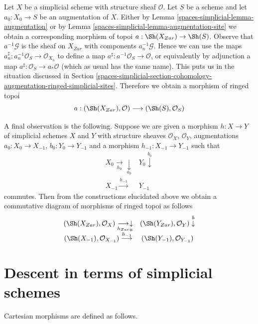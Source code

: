 \medskip\noindent
Let $X$ be a simplicial scheme with structure sheaf $\mathcal{O}$.
Let $S$ be a scheme and let $a_0 : X_0 \to S$ be an augmentation of $X$.
Either by
Lemma \ref{spaces-simplicial-lemma-augmentation} or by
Lemma \ref{spaces-simplicial-lemma-augmentation-site}
we obtain a corresponding morphism of topoi $a : \Sh(X_{Zar}) \to \Sh(S)$.
Observe that $a^{-1}\mathcal{G}$ is the sheaf on $X_{Zar}$ with components
$a_n^{-1}\mathcal{G}$. Hence we can use the maps
$a_n^\sharp : a_n^{-1}\mathcal{O}_S \to \mathcal{O}_{X_n}$ to define
a map $a^\sharp : a^{-1}\mathcal{O}_S \to \mathcal{O}$, or equivalently
by adjunction a map $a^\sharp : \mathcal{O}_S \to a_*\mathcal{O}$
(which as usual has the same name). This puts us in the situation
discussed in
Section \ref{spaces-simplicial-section-cohomology-augmentation-ringed-simplicial-sites}.
Therefore we obtain a morphism of ringed topoi
$$
a : (\Sh(X_{Zar}), \mathcal{O}) \longrightarrow (\Sh(S), \mathcal{O}_S)
$$

\medskip\noindent
A final observation is the following. Suppose we are given a morphism
$h : X \to Y$ of simplicial schemes $X$ and $Y$ with structure sheaves
$\mathcal{O}_X$, $\mathcal{O}_Y$, augmentations
$a_0 : X_0 \to X_{-1}$, $b_0 : Y_0 \to Y_{-1}$ and a morphism
$h_{-1} : X_{-1} \to Y_{-1}$ such that
$$
\begin{array}{cc}X_0 \underset{h_0}{\longrightarrow}\underset{a_0}{\downarrow} & Y_0 \overset{b_0}{\downarrow} \\ X_{-1} \overset{h_{-1}}{\longrightarrow} & Y_{-1}\end{array}
$$
commutes. Then from the constructions elucidated above
we obtain a commutative diagram of morphisms of ringed topoi as follows
$$
\begin{array}{cc}(\Sh(X_{Zar}), \mathcal{O}_X) \underset{h_{Zar}}{\longrightarrow}\underset{a}{\downarrow} & (\Sh(Y_{Zar}), \mathcal{O}_Y) \overset{b}{\downarrow} \\ (\Sh(X_{-1}), \mathcal{O}_{X_{-1}}) \overset{h_{-1}}{\longrightarrow} & (\Sh(Y_{-1}), \mathcal{O}_{Y_{-1}})\end{array}
$$

\section{Descent in terms of simplicial schemes}
\label{spaces-simplicial-section-simplicial-descent}
Cartesian morphisms are defined as follows.

